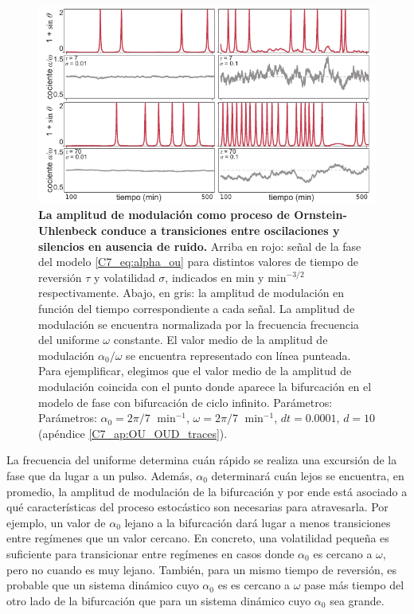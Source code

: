 \documentclass[./main.tex]{subfiles}
\begin{document}
\begin{figure}
    \centering
    \includegraphics[width=1\columnwidth]{figures/chapter7/C7_OU_ex_traces.pdf} 
    \caption{\textbf{La amplitud de modulación como proceso de Ornstein-Uhlenbeck conduce a transiciones entre oscilaciones y silencios en ausencia de ruido.} Arriba en rojo: señal de la fase del modelo \ref{C7_eq:alpha_ou} para distintos valores de tiempo de reversión $\tau$ y volatilidad $\sigma$, indicados en min y $\text{min}^{-3/2}$ respectivamente. Abajo, en gris: la amplitud de modulación en función del tiempo correspondiente a cada señal. La amplitud de modulación se encuentra normalizada por la frecuencia frecuencia del uniforme $\omega$ constante. El valor medio de la amplitud de modulación $\alpha_0/\omega$ se encuentra representado con línea punteada. Para ejemplificar, elegimos que el valor medio de la amplitud de modulación coincida con el punto donde aparece la bifurcación en el modelo de fase con bifurcación de ciclo infinito. Parámetros:  Parámetros: $\alpha_0 = 2\pi/7 \;\text{ min}^{-1}$, $\omega = 2\pi/7 \;\text{ min}^{-1}$, $dt = 0.0001$, $d=10$ (apéndice \ref{C7_ap:OU_OUD_traces}).}
    \label{C7_fig:OU_TS}
\end{figure} 


La frecuencia del uniforme determina cuán rápido se realiza una excursión de la fase que da lugar a un pulso. Además, $\alpha_0$ determinará cuán lejos se encuentra, en promedio, la amplitud de modulación de la bifurcación y por ende está asociado a qué características del proceso estocástico son necesarias para atravesarla. Por ejemplo, un valor de $\alpha_0$ lejano a la bifurcación dará lugar a menos transiciones entre regímenes que un valor cercano. En concreto, una volatilidad pequeña es suficiente para transicionar entre regímenes en casos donde $\alpha_0$ es cercano a $\omega$, pero no cuando es muy lejano. También, para un mismo tiempo de reversión, es probable que un sistema dinámico cuyo $\alpha_0$ es es cercano a $\omega$ pase más tiempo del otro lado de la bifurcación que para un sistema dinámico cuyo $\alpha_0$ sea grande.
\end{document}
